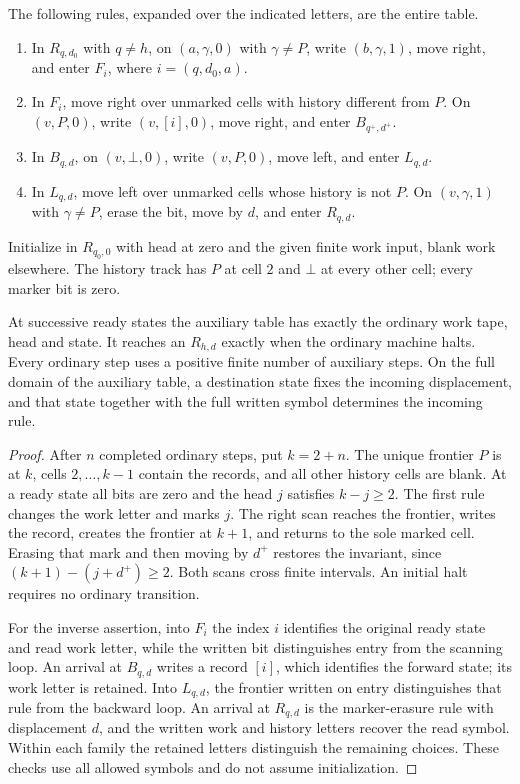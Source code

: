 The following rules, expanded over the indicated letters, are the entire table.
\begin{enumerate}
\item In $R_{q,d_0}$ with $q\ne h$, on $(a,\gamma,0)$ with $\gamma\ne P$, write $(b,\gamma,1)$, move right, and enter $F_i$, where $i=(q,d_0,a)$.
\item In $F_i$, move right over unmarked cells with history different from $P$. On $(v,P,0)$, write $(v,[i],0)$, move right, and enter $B_{q^+,d^+}$.
\item In $B_{q,d}$, on $(v,\bot,0)$, write $(v,P,0)$, move left, and enter $L_{q,d}$.
\item In $L_{q,d}$, move left over unmarked cells whose history is not $P$. On $(v,\gamma,1)$ with $\gamma\ne P$, erase the bit, move by $d$, and enter $R_{q,d}$.
\end{enumerate}
Initialize in $R_{q_0,0}$ with head at zero and the given finite work input, blank work elsewhere. The history track has $P$ at cell $2$ and $\bot$ at every other cell; every marker bit is zero.

\begin{lemma}\label{bcs:delayed-recorder}
At successive ready states the auxiliary table has exactly the ordinary work tape, head and state. It reaches an $R_{h,d}$ exactly when the ordinary machine halts. Every ordinary step uses a positive finite number of auxiliary steps. On the full domain of the auxiliary table, a destination state fixes the incoming displacement, and that state together with the full written symbol determines the incoming rule.
\end{lemma}
\begin{proof}
After $n$ completed ordinary steps, put $k=2+n$. The unique frontier $P$ is at $k$, cells $2,\ldots,k-1$ contain the records, and all other history cells are blank. At a ready state all bits are zero and the head $j$ satisfies $k-j\ge2$. The first rule changes the work letter and marks $j$. The right scan reaches the frontier, writes the record, creates the frontier at $k+1$, and returns to the sole marked cell. Erasing that mark and then moving by $d^+$ restores the invariant, since $(k+1)-(j+d^+)\ge2$. Both scans cross finite intervals. An initial halt requires no ordinary transition.

For the inverse assertion, into $F_i$ the index $i$ identifies the original ready state and read work letter, while the written bit distinguishes entry from the scanning loop. An arrival at $B_{q,d}$ writes a record $[i]$, which identifies the forward state; its work letter is retained. Into $L_{q,d}$, the frontier written on entry distinguishes that rule from the backward loop. An arrival at $R_{q,d}$ is the marker-erasure rule with displacement $d$, and the written work and history letters recover the read symbol. Within each family the retained letters distinguish the remaining choices. These checks use all allowed symbols and do not assume initialization.
\end{proof}

